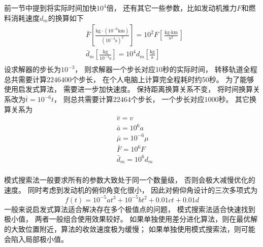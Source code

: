 前一节中提到将实际时间加快$10^4$倍，
还有其它一些参数，比如发动机推力$F$和燃料消耗速度$d_m$的换算如下
\begin{align*}
    &\bar{F}\left[\frac{\text{kg}\cdot(10^{-6}\text{km})}{(10^{-4}\text{s})^2}\right]
     = 10^2F\left[\frac{\text{kg}\cdot\text{km}}{\text{s}^2}\right] \\
    &\bar{d}_m\left[\frac{\text{kg}}{10^{-4}\text{s}}\right]
     = 10^4d_m\left[\frac{\text{kg}}{\text{s}}\right] \\
\end{align*}
设求解器的步长为$10^{-3}$，
则求解器一个步长对应10秒的实际时间，
转移轨道全程总共需要计算$2246400$个步长，
在个人电脑上计算完全程耗时约50秒。
为了能够使用启发式算法，
需要进一步加快速度。
保持距离换算关系不变，
将时间换算关系改为$\bar{t}=10^{-6}t$，
则总共需要计算$22464$个步长，
一个步长对应$1000$秒。
其它换算关系为
\begin{align*}
    &\bar{v} = v \\
    &\bar{a} = 10^6a \\
    &\bar{\mu} = 10^{-6}\mu \\
    &\bar{F} = 10^6F \\
    &\bar{d}_m = 10^6d_m \\
\end{align*}

模式搜索法一般要求所有的参数大致处于同一个数量级，
否则会极大减慢优化的速度。
同时考虑到发动机的俯仰角变化很小，
因此对俯仰角设计的三次多项式为
\[f(t)=10^{-5}at^3+10^{-5}bt^2+0.01ct+0.01d\]
一般来说启发式算法适合解决存在多个极值点的问题，
模式搜索法适合快速找到极小值，
两者一般组合使用效果较好。
如果单独使用差分进化算法，则在最优解的大致位置附近，算法的收敛速度极为缓慢；
如果单独使用模式搜索法，则可能会陷入局部极小值。
